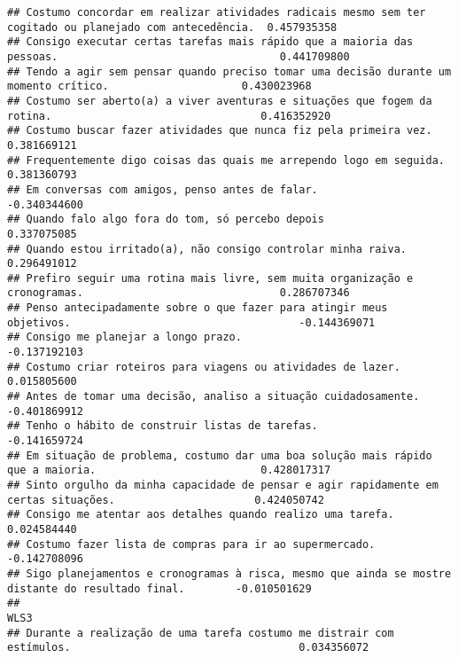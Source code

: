 \documentclass[
]{article}
\begin{document}
\begin{verbatim}
## Costumo concordar em realizar atividades radicais mesmo sem ter cogitado ou planejado com antecedência.  0.457935358
## Consigo executar certas tarefas mais rápido que a maioria das pessoas.                                   0.441709800
## Tendo a agir sem pensar quando preciso tomar uma decisão durante um momento crítico.                     0.430023968
## Costumo ser aberto(a) a viver aventuras e situações que fogem da rotina.                                 0.416352920
## Costumo buscar fazer atividades que nunca fiz pela primeira vez.                                         0.381669121
## Frequentemente digo coisas das quais me arrependo logo em seguida.                                       0.381360793
## Em conversas com amigos, penso antes de falar.                                                          -0.340344600
## Quando falo algo fora do tom, só percebo depois                                                          0.337075085
## Quando estou irritado(a), não consigo controlar minha raiva.                                             0.296491012
## Prefiro seguir uma rotina mais livre, sem muita organização e cronogramas.                               0.286707346
## Penso antecipadamente sobre o que fazer para atingir meus objetivos.                                    -0.144369071
## Consigo me planejar a longo prazo.                                                                      -0.137192103
## Costumo criar roteiros para viagens ou atividades de lazer.                                              0.015805600
## Antes de tomar uma decisão, analiso a situação cuidadosamente.                                          -0.401869912
## Tenho o hábito de construir listas de tarefas.                                                          -0.141659724
## Em situação de problema, costumo dar uma boa solução mais rápido que a maioria.                          0.428017317
## Sinto orgulho da minha capacidade de pensar e agir rapidamente em certas situações.                      0.424050742
## Consigo me atentar aos detalhes quando realizo uma tarefa.                                               0.024584440
## Costumo fazer lista de compras para ir ao supermercado.                                                 -0.142708096
## Sigo planejamentos e cronogramas à risca, mesmo que ainda se mostre distante do resultado final.        -0.010501629
##                                                                                                                 WLS3
## Durante a realização de uma tarefa costumo me distrair com estímulos.                                    0.034356072

\end{verbatim}
\end{document}
